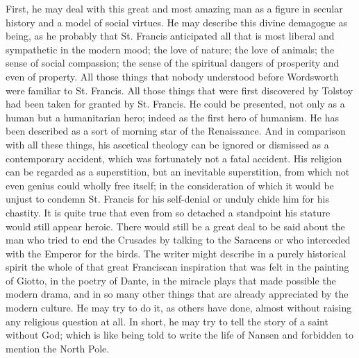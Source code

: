 \documentclass{book}
\begin{document}
First, he may deal with this great and most amazing man as a figure in secular history and a model of social virtues. He may describe this divine demagogue as being, as he probably that St. Francis anticipated all that is most liberal and sympathetic in the modern mood; the love of nature; the love of animals; the sense of social compassion; the sense of the spiritual dangers of prosperity and even of property. All those things that nobody understood before Wordsworth were familiar to St. Francis. All those things that were first discovered by Tolstoy had been taken for granted by St. Francis. He could be presented, not only as a human but a humanitarian hero; indeed as the first hero of humanism. He has been described as a sort of morning star of the Renaissance. And in comparison with all these things, his ascetical theology can be ignored or dismissed as a contemporary accident, which was fortunately not a fatal accident. His religion can be regarded as a superstition, but an inevitable superstition, from which not even genius could wholly free itself; in the consideration of which it would be unjust to condemn St. Francis for his self-denial or unduly chide him for his chastity. It is quite true that even from so detached a standpoint his stature would still appear heroic. There would still be a great deal to be said about the man who tried to end the Crusades by talking to the Saracens or who interceded with the Emperor for the birds. The writer might describe in a purely historical spirit the whole of that great Franciscan inspiration that was felt in the painting of Giotto, in the poetry of Dante, in the miracle plays that made possible the modern drama, and in so many other things that are already appreciated by the modern culture. He may try to do it, as others have done, almost without raising any religious question at all. In short, he may try to tell the story of a saint without God; which is like being told to write the life of Nansen and forbidden to mention the North Pole.
\end{document}
